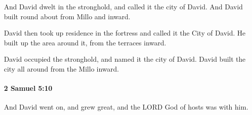 			\begin{versebox}
					\item[BHS] 
					\item[ASV] And David dwelt in the stronghold, and called it the city of David. And David built round about from Millo and inward.
					\item[NIV] David then took up residence in the fortress and called it the City of David. He built up the area around it, from the terraces inward.
					\item[NRSV] David occupied the stronghold, and named it the city of David. David built the city all around from the Millo inward.
			\end{versebox}

		\paragraph{2 Samuel 5:10} %
			\label{2SAMUEL-5-10}

			And David went on, and grew great, and the LORD God of hosts was with him.

